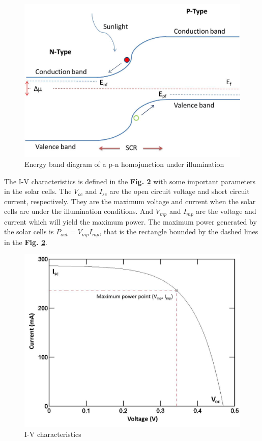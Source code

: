 \documentclass[a4paper, 12pt, titlepage,oneside,drop]{kthesis}
\begin{document}
\begin{figure}[H]
\centering
\includegraphics[scale=0.45]{illumination1.jpg}
\caption{Energy band diagram of a p-n homojunction under illumination}
\label{illu1}
\end{figure}


The I-V characteristics is defined in the \textbf{Fig. \ref{ivcharac}} with some important parameters in the solar cells.
The $V_{oc}$ and $I_{sc}$ are the open circuit voltage and short circuit current, respectively. They are the maximum voltage and current when the solar cells are under the illumination conditions.
And $V_{mp}$ and $I_{mp}$ are the voltage and current which will yield the maximum power. The maximum power generated by the solar cells is $P_{out}=V_{mp} I_{mp}$, that is the rectangle bounded by the dashed lines in the 
\textbf{Fig. \ref{ivcharac}}. 

\begin{figure}[H]
\centering
\includegraphics[scale=0.5]{IV.jpg}
\caption{I-V characteristics}
\label{ivcharac}
\end{figure}
\end{document}
